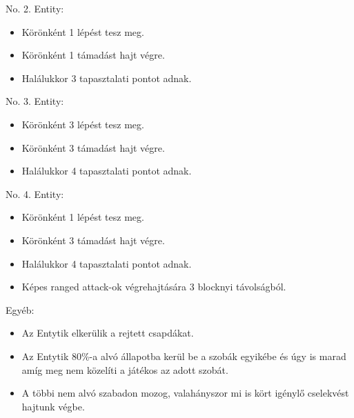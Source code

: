 \noindent No. 2. Entity:
\begin{itemize}
    \item Körönként 1 lépést tesz meg.
    \item Körönként 1 támadást hajt végre.
    \item Halálukkor 3 tapasztalati pontot adnak.
\end{itemize}

\noindent No. 3. Entity:
\begin{itemize}
    \item Körönként 3 lépést tesz meg.
    \item Körönként 3 támadást hajt végre.
    \item Halálukkor 4 tapasztalati pontot adnak.
\end{itemize}

\noindent No. 4. Entity:
\begin{itemize}
    \item Körönként 1 lépést tesz meg.
    \item Körönként 3 támadást hajt végre.
    \item Halálukkor 4 tapasztalati pontot adnak.
    \item Képes ranged attack-ok végrehajtására 3 blocknyi távolságból.
\end{itemize}

\noindent Egyéb:
\begin{itemize}
    \item Az Entytik elkerülik a rejtett csapdákat.
    \item Az Entytik 80\%-a alvó állapotba kerül be a szobák egyikébe és úgy is marad amíg meg nem közelíti a játékos az adott szobát.
    \item A többi nem alvó szabadon mozog, valahányszor mi is kört igénylő cselekvést hajtunk végbe.
\end{itemize}


